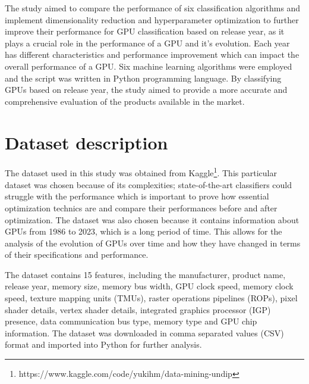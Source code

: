 \documentclass[conference,onecolumn]{IEEEtran}
\begin{document}
The study aimed to compare the performance of six classification algorithms and implement dimensionality reduction and hyperparameter optimization to further improve their performance for GPU classification based on release year, as it plays a crucial role in the performance of a GPU and it's evolution. Each year has different characteristics and performance improvement which can impact the overall performance of a GPU. Six machine learning algorithms were employed and the script was written in Python programming language. By classifying GPUs based on release year, the study aimed to provide a more accurate and comprehensive evaluation of the products available in the market.

\section{Dataset description}
    The dataset used in this study was obtained from Kaggle\footnote{https://www.kaggle.com/code/yukihm/data-mining-undip}. This particular dataset was chosen because of its complexities; state-of-the-art classifiers could struggle with the performance which is important to prove how essential optimization technics are and compare their performances before and after optimization. The dataset was also chosen because it contains information about GPUs from 1986 to 2023, which is a long period of time. This allows for the analysis of the evolution of GPUs over time and how they have changed in terms of their specifications and performance.
    
    The dataset contains 15 features, including the manufacturer, product name, release year, memory size, memory bus width, GPU clock speed, memory clock speed, texture mapping units (TMUs), raster operations pipelines (ROPs), pixel shader details, vertex shader details, integrated graphics processor (IGP) presence, data communication bus type, memory type and GPU chip information. The dataset was downloaded in comma separated values (CSV) format and imported into Python for further analysis. 
\end{document}
